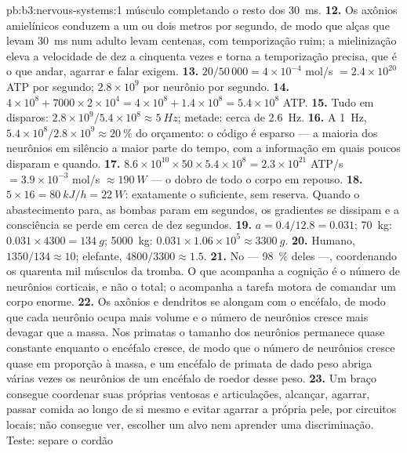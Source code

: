 \begin{solution}{pb:b3:nervous-systems:1}
músculo completando o resto dos \qty{30}{ms}.
\textbf{12.} Os axônios amielínicos conduzem a um ou dois metros por
segundo, de modo que alças que levam \qty{30}{ms} num adulto levam
centenas, com temporização ruim; a mielinização eleva a velocidade de
dez a cinquenta vezes e torna a temporização precisa, que é o que andar,
agarrar e falar exigem.
\textbf{13.} $20/50\,000 = 4\times 10^{-4}$ mol/s $= 2.4\times 10^{20}$
ATP por segundo; $2.8\times 10^{9}$ por neurônio por segundo.
\textbf{14.} $4\times 10^{8} + 7000\times 2\times 10^{4} = 4\times 10^{8}
+ 1.4\times 10^{8} = 5.4\times 10^{8}$ ATP.
\textbf{15.} Tudo em disparos: $2.8\times 10^{9}/5.4\times 10^{8} \approx
\qty{5}{Hz}$; metade: cerca de \qty{2.6}{Hz}.
\textbf{16.} A \qty{1}{Hz}, $5.4\times 10^{8}/2.8\times 10^{9} \approx
\qty{20}{\%}$ do orçamento: o código é esparso --- a maioria dos
neurônios em silêncio a maior parte do tempo, com a informação em quais
poucos disparam e quando.
\textbf{17.} $8.6\times 10^{10}\times 50\times 5.4\times 10^{8} = 2.3
\times 10^{21}$ ATP/s $= 3.9\times 10^{-3}$ mol/s $\approx \qty{190}{W}$
--- o dobro de todo o corpo em repouso.
\textbf{18.} $5\times 16 = \qty{80}{kJ/h} = \qty{22}{W}$: exatamente o
suficiente, sem reserva. Quando o abastecimento para, as bombas param em
segundos, os gradientes se dissipam e a consciência se perde em cerca de
dez segundos.
\textbf{19.} $a = 0.4/12.8 = 0.031$; \qty{70}{kg}: $0.031\times 4300 =
\qty{134}{g}$; \qty{5000}{kg}: $0.031\times 1.06\times 10^{5} \approx
\qty{3300}{g}$.
\textbf{20.} Humano, $1350/134 \approx 10$; elefante, $4800/3300 \approx
1.5$.
\textbf{21.} No  --- \qty{98}{\%} deles ---, coordenando os
quarenta mil músculos da tromba. O que acompanha a cognição é o número
de neurônios corticais, e não o total; o  acompanha a tarefa
motora de comandar um corpo enorme.
\textbf{22.} Os axônios e dendritos se alongam com o encéfalo, de modo
que cada neurônio ocupa mais volume e o número de neurônios cresce mais
devagar que a massa. Nos primatas o tamanho dos neurônios permanece
quase constante enquanto o encéfalo cresce, de modo que o número de
neurônios cresce quase em proporção à massa, e um encéfalo de primata de
dado peso abriga várias vezes os neurônios de um encéfalo de roedor
desse peso.
\textbf{23.} Um braço consegue coordenar suas próprias ventosas e
articulações, alcançar, agarrar, passar comida ao longo de si mesmo e
evitar agarrar a própria pele, por circuitos locais; não consegue ver,
escolher um alvo nem aprender uma discriminação. Teste: separe o cordão

\end{solution}

